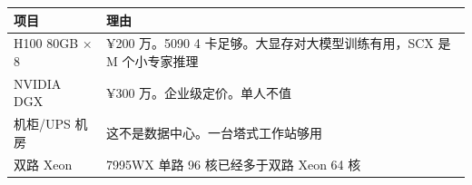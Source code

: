 \documentclass[
  12pt,
]{ctexart}
\begin{document}
\begin{longtable}[]{@{}
  >{\raggedright\arraybackslash}p{}
  >{\raggedright\arraybackslash}p{}@{}}
\toprule\noalign{}
\begin{minipage}[b]{\linewidth}\raggedright
项目
\end{minipage} & \begin{minipage}[b]{\linewidth}\raggedright
理由
\end{minipage} \\
\midrule\noalign{}
\endhead
\bottomrule\noalign{}
\endlastfoot
H100 80GB × 8 & ¥200 万。5090 4 卡足够。大显存对大模型训练有用，SCX 是 M
个小专家推理 \\
NVIDIA DGX & ¥300 万。企业级定价。单人不值 \\
机柜/UPS 机房 & 这不是数据中心。一台塔式工作站够用 \\
双路 Xeon & 7995WX 单路 96 核已经多于双路 Xeon 64 核 \\
\end{longtable}
\end{document}
